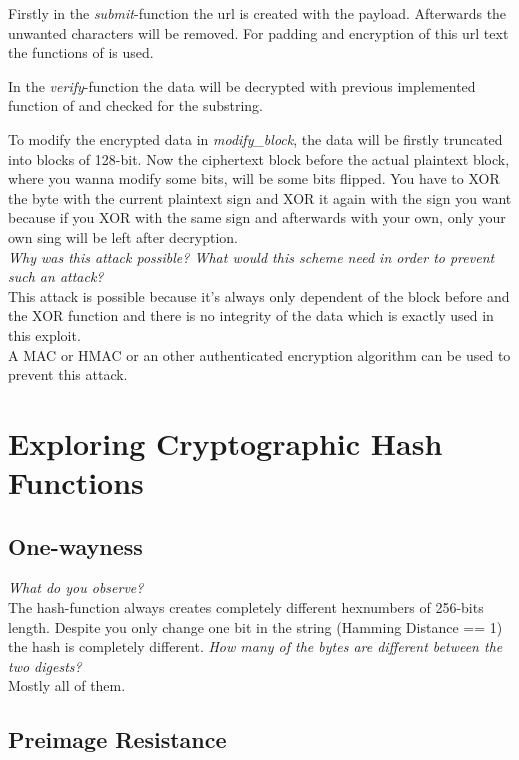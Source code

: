 Firstly in the \textit{submit}-function the url is created with the payload. Afterwards the unwanted characters will be removed. For padding and encryption of this url text the functions of  is used.

In the \textit{verify}-function the data will be decrypted with previous implemented function of  and checked for the substring.

To modify the encrypted data in \textit{modify\_block}, the data will be firstly truncated into blocks of 128-bit. Now the ciphertext block before the actual plaintext block, where you wanna modify some bits, will be some bits flipped. You have to XOR the byte with the current plaintext sign and XOR it again with the sign you want because if you XOR with the same sign and afterwards with your own, only your own sing will be left after decryption.\\

\textit{Why was this attack possible? What would this scheme need in order to prevent such an attack?}\\
This attack is possible because it's always only dependent of the block before and the XOR function and there is no integrity of the data which is exactly used in this exploit.\\
A MAC or HMAC or an other authenticated encryption algorithm can be used to prevent this attack.\\


\section{Exploring Cryptographic Hash Functions}

\subsection{One-wayness}


\textit{What do you observe?}\\
The hash-function always creates completely different hexnumbers of 256-bits length. Despite you only change one bit in the string (Hamming Distance == 1) the hash is completely different.
\textit{How many of the bytes are different between the two digests?}\\
Mostly all of them.\\

\subsection{Preimage Resistance}


